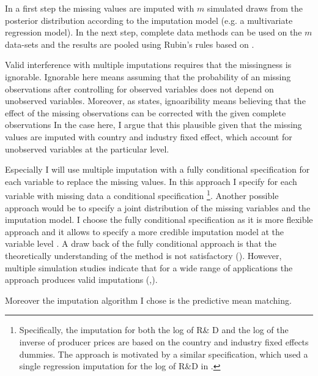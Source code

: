  In a first step the missing values are imputed with $m$ simulated draws from the posterior distribution according to the imputation model (e.g. a multivariate regression model).
In the next step, complete data methods can be used on the $m$ data-sets and the results are pooled using Rubin's rules based on \textcite[p.77]{Rubin1987}.  \par
Valid interference with multiple imputations requires that the missingness is ignorable. 
Ignorable here means assuming that the probability of an missing observations after controlling for observed variables does not depend on unobserved variables.
Moreover, as \textcite[p.223]{van2007multiple} states,  ignoaribility means believing that the effect of the missing observations can be corrected with the given complete observations
In the case here, I argue that this plausible  given that the missing values are imputed with country and industry fixed effect, which account for unobserved variables at the particular level.  
  \par  Especially I will use multiple imputation with a fully conditional specification for each variable to replace the missing values.
In this approach I specify for each variable with missing data a conditional specification
\footnote{Specifically, the imputation for both the log of R\& D and the log of the inverse of producer prices are based on the country and industry fixed effects dummies. The approach is motivated by a similar specification, which used a single regression imputation for the log of R\&D in \textcite{costinot}.}.
Another possible approach would be to specify a joint distribution of the missing variables and the imputation model.
I choose the fully conditional specification as it is more flexible approach and it allows to specify a more credible imputation model at the variable level \textcite{van2000mice}.
A draw back of the fully conditional approach is that the theoretically understanding of the method is not satisfactory   (\textcite{van2007multiple}).
However, multiple simulation studies indicate that for a wide range of applications the approach produces valid imputations (\textcite{van2007multiple},\textcite{van2006fully}). \par
Moreover the imputation algorithm I chose is the predictive mean matching. 
